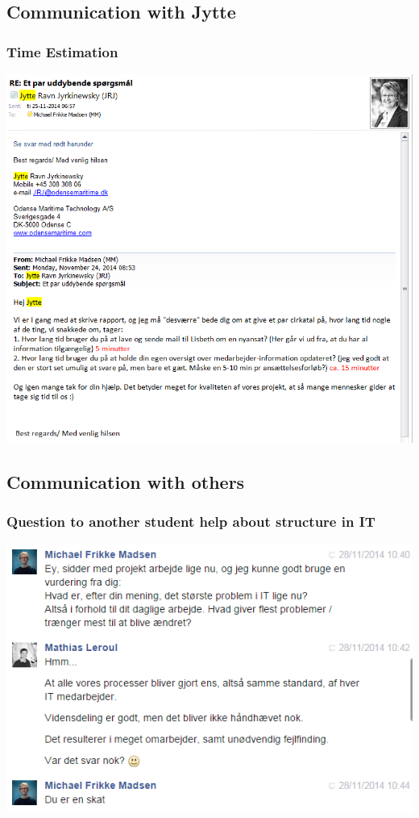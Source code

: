 \subsection{Communication with Jytte}

\subsubsection{Time Estimation}
\includegraphics[width=1.36\textwidth]{appendix/jytte_communication_1}

\subsection{Communication with others}

\subsubsection{Question to another student help about structure in IT}
\includegraphics[width=1.36\textwidth]{appendix/other_communication_1}